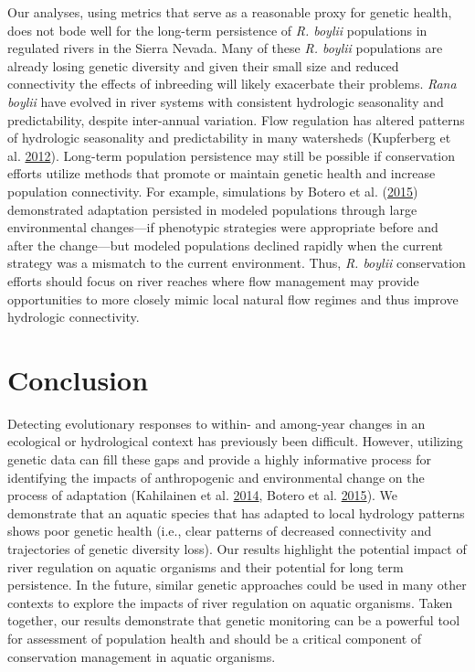 \documentclass[proquest,12pt,final]{ucthesis-CA2012} %
\begin{document}
\begin{ucmainmatter}
Our analyses, using metrics that serve as a reasonable proxy for genetic
health, does not bode well for the long-term persistence of \emph{R.
boylii} populations in regulated rivers in the Sierra Nevada. Many of
these \emph{R. boylii} populations are already losing genetic diversity
and given their small size and reduced connectivity the effects of
inbreeding will likely exacerbate their problems. \emph{Rana boylii}
have evolved in river systems with consistent hydrologic seasonality and
predictability, despite inter-annual variation. Flow regulation has
altered patterns of hydrologic seasonality and predictability in many
watersheds (Kupferberg et al.
\protect\hyperlink{ref-kupferberg_effects_2012}{2012}). Long-term
population persistence may still be possible if conservation efforts
utilize methods that promote or maintain genetic health and increase
population connectivity. For example, simulations by Botero et al.
(\protect\hyperlink{ref-botero_evolutionary_2015}{2015}) demonstrated
adaptation persisted in modeled populations through large environmental
changes---if phenotypic strategies were appropriate before and after the
change---but modeled populations declined rapidly when the current
strategy was a mismatch to the current environment. Thus, \emph{R.
boylii} conservation efforts should focus on river reaches where flow
management may provide opportunities to more closely mimic local natural
flow regimes and thus improve hydrologic connectivity.

\hypertarget{conclusion}{%
\section{Conclusion}\label{conclusion}}

Detecting evolutionary responses to within- and among-year changes in an
ecological or hydrological context has previously been difficult.
However, utilizing genetic data can fill these gaps and provide a highly
informative process for identifying the impacts of anthropogenic and
environmental change on the process of adaptation (Kahilainen et al.
\protect\hyperlink{ref-kahilainen_conservation_2014}{2014}, Botero et
al. \protect\hyperlink{ref-botero_evolutionary_2015}{2015}). We
demonstrate that an aquatic species that has adapted to local hydrology
patterns shows poor genetic health (i.e., clear patterns of decreased
connectivity and trajectories of genetic diversity loss). Our results
highlight the potential impact of river regulation on aquatic organisms
and their potential for long term persistence. In the future, similar
genetic approaches could be used in many other contexts to explore the
impacts of river regulation on aquatic organisms. Taken together, our
results demonstrate that genetic monitoring can be a powerful tool for
assessment of population health and should be a critical component of
conservation management in aquatic organisms.


\end{ucmainmatter}
\end{document}
